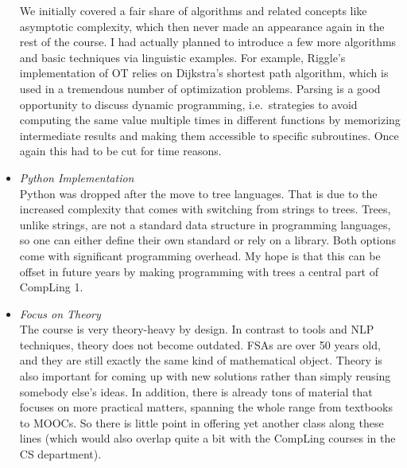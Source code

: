 \begin{itemize}
        We initially covered a fair share of algorithms and related concepts like asymptotic complexity, which then never made an appearance again in the rest of the course.
        I had actually planned to introduce a few more algorithms and basic techniques via linguistic examples.
        For example, Riggle's implementation of OT relies on Dijkstra's shortest path algorithm, which is used in a tremendous number of optimization problems.
        Parsing is a good opportunity to discuss dynamic programming, i.e.\ strategies to avoid computing the same value multiple times in different functions by memorizing intermediate results and making them accessible to specific subroutines.
        Once again this had to be cut for time reasons.
    \item \emph{Python Implementation}\\
        Python was dropped after the move to tree languages.
        That is due to the increased complexity that comes with switching from strings to trees.
        Trees, unlike strings, are not a standard data structure in programming languages, so one can either define their own standard or rely on a library. 
        Both options come with significant programming overhead.
        My hope is that this can be offset in future years by making programming with trees a central part of CompLing 1.
    \item \emph{Focus on Theory}\\
        The course is very theory-heavy by design.
        In contrast to tools and NLP techniques, theory does not become outdated.
        FSAs are over 50 years old, and they are still exactly the same kind of mathematical object.
        Theory is also important for coming up with new solutions rather than simply reusing somebody else's ideas.
        In addition, there is already tons of material that focuses on more practical matters, spanning the whole range from textbooks to MOOCs.
        So there is little point in offering yet another class along these lines (which would also overlap quite a bit with the CompLing courses in the CS department).


\end{itemize}
